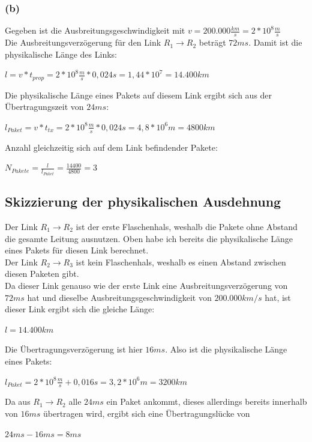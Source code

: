 \documentclass{kdiartcl}
\begin{document}
    \subsubsection*{(b)}
    Gegeben ist die Ausbreitungsgeschwindigkeit mit $v = 200.000 \frac{km}{s} = 2 * 10^{8}\frac{m}{s}$ \\
    Die Ausbreitungsverzögerung für den Link $R_1 \rightarrow R_2$ beträgt $72ms$. Damit ist die physikalische Länge des Links: \\
    \begin{center}
        $l = v * t_{prop} = 2 * 10^8 \frac{m}{s} * 0,024s = 1,44 * 10^7 = 14.400km$
    \end{center}
    Die physikalische Länge eines Pakets auf diesem Link ergibt sich aus der Übertragungszeit von $24ms$:\\
    \begin{center}
        $l_{Paket} = v * t_{tx} = 2*10^8 \frac{m}{s} * 0,024s = 4,8 * 10^6m = 4800km$
    \end{center}
    Anzahl gleichzeitig sich auf dem Link befindender Pakete: \\
    \begin{center}
        $N_{Pakete} = \frac{l}{l_{Paket}} = \frac{14400}{4800} = 3$
    \end{center}

    \subsection{Skizzierung der physikalischen Ausdehnung}
    Der Link $R_1 \rightarrow R_2$ ist der erste Flaschenhals, weshalb die Pakete ohne Abstand die gesamte Leitung ausnutzen. Oben habe ich bereits die physikalische Länge eines Pakets für diesen Link berechnet. \\
    Der Link $R_2 \rightarrow R_3$ ist kein Flaschenhals, weshalb es einen Abstand zwischen diesen Paketen gibt. \\
    Da dieser Link genauso wie der erste Link eine Ausbreitungsverzögerung von $72ms$ hat und dieselbe Ausbreitungsgeschwindigkeit von $200.000km/s$ hat, ist dieser Link ergibt sich die gleiche Länge: \\
    \begin{center}
        $l = 14.400km$
    \end{center}

    Die Übertragungsverzögerung ist hier $16ms$. Also ist die physikalische Länge eines Pakets: \\
    \begin{center}
        $l_{Paket} = 2 * 10^{8} \frac{m}{s} + 0,016s = 3,2 * 10^6m = 3200km$
    \end{center}
    Da aus $R_1 \rightarrow R_2$ alle $24ms$ ein Paket ankommt, dieses allerdings bereits innerhalb von $16ms$ übertragen wird, ergibt sich eine Übertragungslücke von \\ 
    \begin{center}
        $24ms - 16ms = 8ms$
    \end{center}
\end{document}
